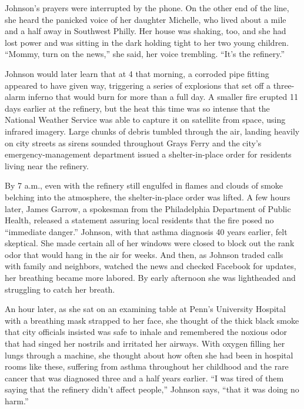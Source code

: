 Johnson's prayers were interrupted by the phone. On the other end of the
line, she heard the panicked voice of her daughter Michelle, who lived
about a mile and a half away in Southwest Philly. Her house was shaking,
too, and she had lost power and was sitting in the dark holding tight to
her two young children. ``Mommy, turn on the news,'' she said, her voice
trembling. ``It's the refinery.''

Johnson would later learn that at 4 that morning, a corroded pipe
fitting appeared to have given way, triggering a series of explosions
that set off a three-alarm inferno that would burn for more than a full
day. A smaller fire erupted 11 days earlier at the refinery, but the
heat this time was so intense that the National Weather Service was able
to capture it on satellite from space, using infrared imagery. Large
chunks of debris tumbled through the air, landing heavily on city
streets as sirens sounded throughout Grays Ferry and the city's
emergency-management department issued a shelter-in-place order for
residents living near the refinery.

By 7 a.m., even with the refinery still engulfed in flames and clouds of
smoke belching into the atmosphere, the shelter-in-place order was
lifted. A few hours later, James Garrow, a spokesman from the
Philadelphia Department of Public Health, released a statement assuring
local residents that the fire posed no ``immediate danger.'' Johnson,
with that asthma diagnosis 40 years earlier, felt skeptical. She made
certain all of her windows were closed to block out the rank odor that
would hang in the air for weeks. And then, as Johnson traded calls with
family and neighbors, watched the news and checked Facebook for updates,
her breathing became more labored. By early afternoon she was
lightheaded and struggling to catch her breath.

An hour later, as she sat on an examining table at Penn's University
Hospital with a breathing mask strapped to her face, she thought of the
thick black smoke that city officials insisted was safe to inhale and
remembered the noxious odor that had singed her nostrils and irritated
her airways. With oxygen filling her lungs through a machine, she
thought about how often she had been in hospital rooms like these,
suffering from asthma throughout her childhood and the rare cancer that
was diagnosed three and a half years earlier. ``I was tired of them
saying that the refinery didn't affect people,'' Johnson says, ``that it
was doing no harm.''

